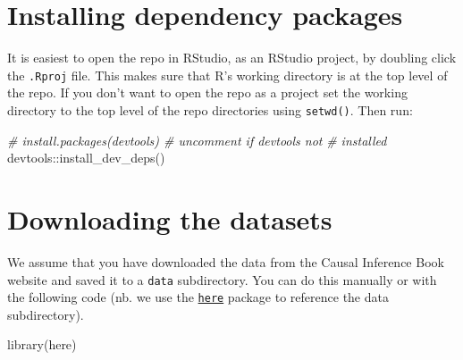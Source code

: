 \documentclass[
  10pt,
]{book}
\newenvironment{Shaded}{\begin{snugshade}}{\end{snugshade}}
\newcommand{\CommentTok}[1]{\textcolor[rgb]{0.56,0.35,0.01}{\textit{#1}}}
\newcommand{\FunctionTok}[1]{\textcolor[rgb]{0.00,0.00,0.00}{#1}}
\newcommand{\NormalTok}[1]{#1}
\newcommand{\SpecialCharTok}[1]{\textcolor[rgb]{0.00,0.00,0.00}{#1}}
\begin{document}
\hypertarget{installing-dependency-packages}{%
\section{Installing dependency packages}\label{installing-dependency-packages}}

It is easiest to open the repo in RStudio, as an RStudio project, by doubling click the \texttt{.Rproj} file. This makes sure that R's working directory is at the top level of the repo. If you don't want to open the repo as a project set the working directory to the top level of the repo directories using \texttt{setwd()}. Then run:

\begin{Shaded}
\begin{Highlighting}[]
\CommentTok{\# install.packages(\textquotesingle{}devtools\textquotesingle{}) \# uncomment if devtools not}
\CommentTok{\# installed}
\NormalTok{devtools}\SpecialCharTok{::}\FunctionTok{install\_dev\_deps}\NormalTok{()}
\end{Highlighting}
\end{Shaded}

\hypertarget{downloading-the-datasets}{%
\section{Downloading the datasets}\label{downloading-the-datasets}}

We assume that you have downloaded the data from the Causal Inference Book website and saved it to a \texttt{data} subdirectory. You can do this manually or with the following code (nb. we use the \href{https://here.r-lib.org/}{\texttt{here}} package to reference the data subdirectory).

\begin{Shaded}
\begin{Highlighting}[]
\FunctionTok{library}\NormalTok{(here)}
\end{Highlighting}
\end{Shaded}
\end{document}
